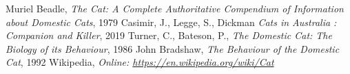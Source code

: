 \documentclass{article}
\begin{document}
\printnoidxglossary[style=listdotted]

\begin{thebibliography}{8}
     Muriel Beadle, \emph{The Cat: A Complete Authoritative Compendium of Information about Domestic Cats}, 1979
     Casimir, J., Legge, S., Dickman \emph{Cats in Australia : Companion and Killer}, 2019
     Turner, C., Bateson, P., \emph{The Domestic Cat: The Biology of its Behaviour}, 1986
     John Bradshaw, \emph{The Behaviour of the Domestic Cat}, 1992
     Wikipedia, \emph{Online: \url{https://en.wikipedia.org/wiki/Cat}}
\end{thebibliography}


\fancyfoot[L]{}
\end{document}
